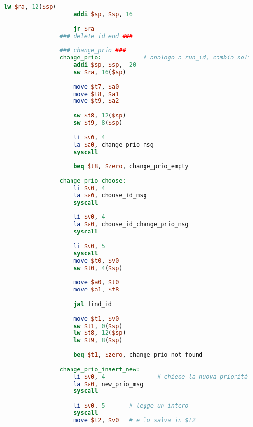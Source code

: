 \begin{center}
\begin{lstlisting}[language=mips, gobble=14, stepnumber=1]
                    lw $ra, 12($sp)
                    addi $sp, $sp, 16
                    
                    jr $ra
                ### delete_id end ###
                    
                ### change_prio ###
                change_prio:            # analogo a run_id, cambia soltanto la parte centrale
                    addi $sp, $sp, -20
                    sw $ra, 16($sp)
                
                    move $t7, $a0
                    move $t8, $a1
                    move $t9, $a2
                    
                    sw $t8, 12($sp)
                    sw $t9, 8($sp)
                
                    li $v0, 4
                    la $a0, change_prio_msg
                    syscall
                    
                    beq $t8, $zero, change_prio_empty
                    
                change_prio_choose:
                    li $v0, 4
                    la $a0, choose_id_msg
                    syscall
                    
                    li $v0, 4
                    la $a0, choose_id_change_prio_msg
                    syscall
                    
                    li $v0, 5
                    syscall
                    move $t0, $v0
                    sw $t0, 4($sp)
                    
                    move $a0, $t0
                    move $a1, $t8
                    
                    jal find_id
                    
                    move $t1, $v0
                    sw $t1, 0($sp)
                    lw $t8, 12($sp)
                    lw $t9, 8($sp)
                    
                    beq $t1, $zero, change_prio_not_found
                    
                change_prio_insert_new:
                    li $v0, 4               # chiede la nuova priorità del task
                    la $a0, new_prio_msg
                    syscall
                    
                    li $v0, 5       # legge un intero
                    syscall
                    move $t2, $v0   # e lo salva in $t2
                

\end{lstlisting}
\end{center}
